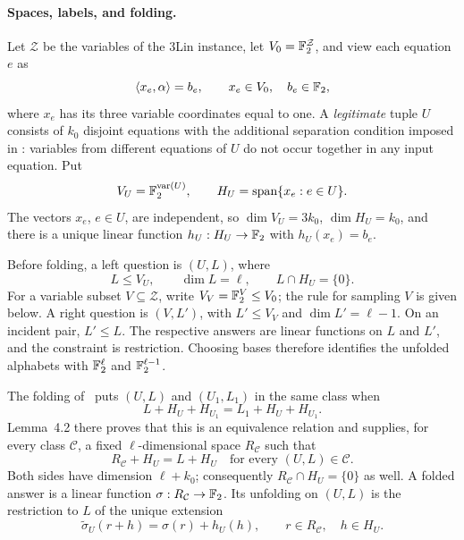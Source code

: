 \paragraph{Spaces, labels, and folding.}
Let $\mathcal Z$ be the variables of the 3Lin instance, let
$V_0=\mathbb F_2^{\mathcal Z}$, and view each equation $e$ as
\[
  \langle x_e,\alpha\rangle=b_e,
  \qquad x_e\in V_0,\quad b_e\in\mathbb F_2,
\]
where $x_e$ has its three variable coordinates equal to one.  A
\emph{legitimate} tuple $U$ consists of $k_0$ disjoint equations with
the additional separation condition imposed in
\cite[Section~4.2]{DKKMS25}: variables from different equations of $U$
do not occur together in any input equation.  Put
\[
  V_U=\mathbb F_2^{\operatorname{var}(U)},
  \qquad H_U=\operatorname{span}\{x_e:e\in U\}.
\]
The vectors $x_e$, $e\in U$, are independent, so $\dim V_U=3k_0$,
$\dim H_U=k_0$, and there is a unique linear function
$h_U:H_U\to\mathbb F_2$ with $h_U(x_e)=b_e$.

Before folding, a left question is $(U,L)$, where
\[
  L\leq V_U,\qquad \dim L=\ell,\qquad L\cap H_U=\{0\}.
\]
For a variable subset $V\subseteq\mathcal Z$, write $V_V=\mathbb F_2^V\le V_0$;
the rule for sampling $V$ is given below. A right question is $(V,L')$,
with $L'\leq V_V$ and
$\dim L'=\ell-1$.  On an incident pair, $L'\leq L$.
The respective answers are linear functions on $L$ and $L'$, and the
constraint is restriction.  Choosing bases therefore identifies the
unfolded alphabets with $\mathbb F_2^\ell$ and $\mathbb F_2^{\ell-1}$.

The folding of~\cite[Section~4.2]{DKKMS25} puts $(U,L)$ and $(U_1,L_1)$
in the same class when
\[
 L+H_U+H_{U_1}=L_1+H_U+H_{U_1}.
\]
Lemma~4.2 there proves that this is an equivalence relation and supplies,
for every class $\mathcal C$,
a fixed $\ell$-dimensional space $R_{\mathcal C}$ such that
\begin{equation}
  R_{\mathcal C}+H_U=L+H_U
  \quad\text{for every }(U,L)\in\mathcal C.
  \label{eq:affine-complements}
\end{equation}
Both sides have dimension $\ell+k_0$; consequently
$R_{\mathcal C}\cap H_U=\{0\}$ as well.  A folded answer is a linear
function $\sigma:R_{\mathcal C}\to\mathbb F_2$.  Its unfolding on $(U,L)$ is
the restriction to $L$ of the unique extension
\begin{equation}
  \widetilde\sigma_U(r+h)=\sigma(r)+h_U(h),
  \qquad r\in R_{\mathcal C},\quad h\in H_U.
  \label{eq:affine-unfolding}
\end{equation}

